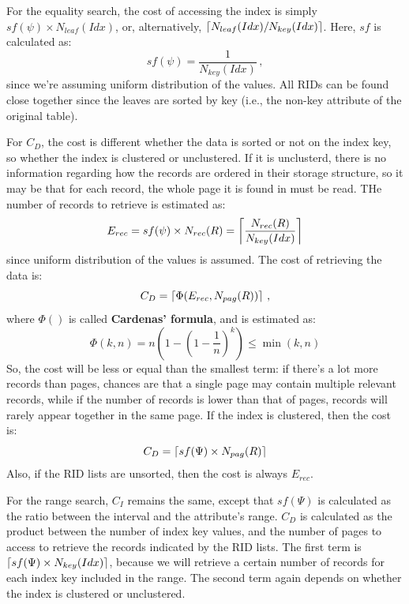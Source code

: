 For the equality search, the cost of accessing the index is simply $sf(\psi) \times N_{leaf}(Idx)$, or, alternatively, $\left\lceil N_{leaf}(Idx) / N_{key}(Idx)\right\rceil$. Here, $sf$ is calculated as:
\begin{equation*}
    sf(\psi) = \dfrac{1}{N_{key}(Idx)} \,,
\end{equation*}
since we're assuming uniform distribution of the values. All RIDs can be found close together since the leaves are sorted by key (i.e., the non-key attribute of the original table).

For $C_D$, the cost is different whether the data is sorted or not on the index key, so whether the index is clustered or unclustered. If it is unclusterd, there is no information regarding how the records are ordered in their storage structure, so it may be that for each record, the whole page it is found in must be read. THe number of records to retrieve is estimated as:
\begin{equation*}
    E_{rec} = sf(\psi) \times N_{rec}(R) = \left\lceil\dfrac{N_{rec}(R)}{N_{key}(Idx)}\right\rceil
\end{equation*}
since uniform distribution of the values is assumed.
The cost of retrieving the data is:
\begin{equation*}
    C_D = \left\lceil\Phi(E_{rec}, N_{pag}(R))\right\rceil \,,
\end{equation*}
where $\Phi()$ is called \textbf{Cardenas' formula}, and is estimated as:
\begin{equation*}
    \Phi(k,n) = n(1 - (1 - \dfrac{1}{n})^k) \leq \min(k,n)
\end{equation*}
So, the cost will be less or equal than the smallest term: if there's a lot more records than pages, chances are that a single page may contain multiple relevant records, while if the number of records is lower than that of pages, records will rarely appear together in the same page. If the index is clustered, then the cost is:
\begin{equation*}
    C_D = \left\lceil sf(\Psi) \times N_{pag}(R)\right\rceil 
\end{equation*}
Also, if the RID lists are unsorted, then the cost is always $E_{rec}$.

For the range search, $C_I$ remains the same, except that $sf(\Psi)$ is calculated as the ratio between the interval and the attribute's range. $C_D$ is calculated as the product between the number of index key values, and the number of pages to access to retrieve the records indicated by the RID lists. The first term is $\left\lceil sf(\Psi) \times N_{key}(Idx)\right\rceil$, because we will retrieve a certain number of records for each index key included in the range. The second term again depends on whether the index is clustered or unclustered.

